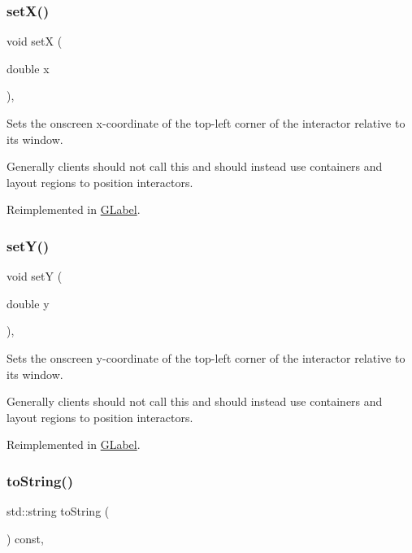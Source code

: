 \subsubsection{\texorpdfstring{set\+X()}{setX()}}
{\footnotesize\ttfamily void setX (\begin{DoxyParamCaption}\item[{double}]{x }\end{DoxyParamCaption})\hspace{0.3cm}{\ttfamily [virtual]}, {\ttfamily [inherited]}}



Sets the onscreen x-\/coordinate of the top-\/left corner of the interactor relative to its window. 

Generally clients should not call this and should instead use containers and layout regions to position interactors. 

Reimplemented in \mbox{\hyperlink{classGLabel_a173837ba805eaa2411e88834869d3a9c}{G\+Label}}.

\mbox{\label{classGInteractor_a7d57e2a5c35d27feb58fd498a3cf82b9}} 
\subsubsection{\texorpdfstring{set\+Y()}{setY()}}
{\footnotesize\ttfamily void setY (\begin{DoxyParamCaption}\item[{double}]{y }\end{DoxyParamCaption})\hspace{0.3cm}{\ttfamily [virtual]}, {\ttfamily [inherited]}}



Sets the onscreen y-\/coordinate of the top-\/left corner of the interactor relative to its window. 

Generally clients should not call this and should instead use containers and layout regions to position interactors. 

Reimplemented in \mbox{\hyperlink{classGLabel_a0b738606c7aca5c472b66c4e55b3c685}{G\+Label}}.

\mbox{\label{classGObservable_a1fe5121d6528fdea3f243321b3fa3a49}} 
\subsubsection{\texorpdfstring{to\+String()}{toString()}}
{\footnotesize\ttfamily std\+::string to\+String (\begin{DoxyParamCaption}{ }\end{DoxyParamCaption}) const\hspace{0.3cm}{\ttfamily [virtual]}, {\ttfamily [inherited]}}



